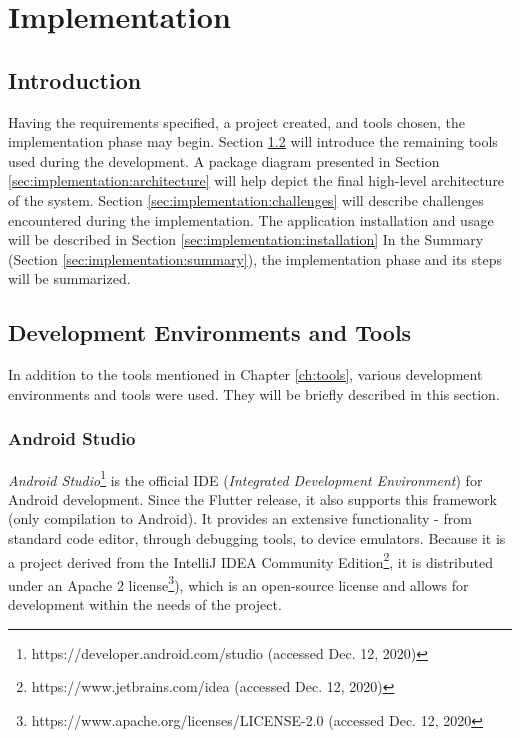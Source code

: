 \chapter{Implementation}\label{ch:implementation}
\section{Introduction}\label{sec:implementation:introduction}
Having the requirements specified, a project created, and tools chosen, the implementation phase may begin. Section \ref{sec:implementation:tools} will introduce the remaining tools used during the development. A package diagram presented in Section \ref{sec:implementation:architecture} will help depict the final high-level architecture of the system. Section \ref{sec:implementation:challenges} will describe challenges encountered during the implementation. The application installation and usage will be described in Section \ref{sec:implementation:installation} In the Summary (Section \ref{sec:implementation:summary}), the implementation phase and its steps will be summarized.

\section{Development Environments and Tools}\label{sec:implementation:tools}
In addition to the tools mentioned in Chapter \ref{ch:tools}, various development environments and tools were used. They will be briefly described in this section.

\subsection{Android Studio}
\textit{Android Studio}\footnote{https://developer.android.com/studio (accessed Dec. 12, 2020)} is the official IDE (\textit{Integrated Development Environment}) for Android development. Since the Flutter release, it also supports this framework (only compilation to Android). It provides an extensive functionality - from standard code editor, through debugging tools, to device emulators. Because it is a project derived from the IntelliJ IDEA Community Edition\footnote{https://www.jetbrains.com/idea (accessed Dec. 12, 2020)}, it is distributed under an Apache 2 license\footnote{https://www.apache.org/licenses/LICENSE-2.0 (accessed Dec. 12, 2020}), which is an open-source license and allows for development within the needs of the project.


